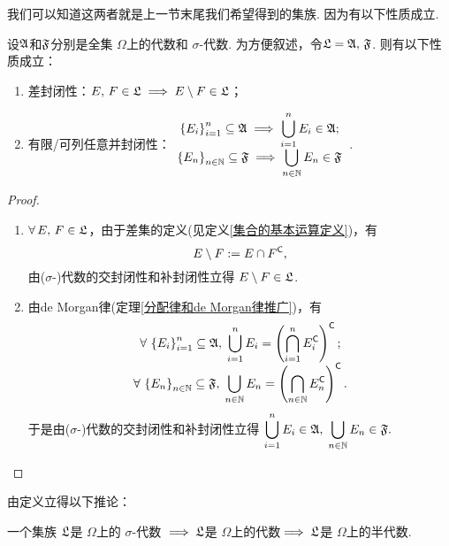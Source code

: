 我们可以知道这两者就是上一节末尾我们希望得到的集族. 因为有以下性质成立.
\begin{proposition}\label{差和并封闭性命题}
    设${\mathfrak{A}}$和${\mathfrak{F}}$分别是全集 $\Omega$上的代数和 $\sigma$-代数. 为方便叙述，令${\mathfrak{L}}={\mathfrak{A}},\,{\mathfrak{F}}$. 则有以下性质成立：
    \begin{enumerate}
        \item 差封闭性：$E,\,F\in{\mathfrak{L}}\implies E\setminus F\in{\mathfrak{L}}$；
        \item 有限/可列任意并封闭性：$\begin{array}{c}
            \displaystyle \left\{ E_i \right\}_{i=1}^n \subseteq{\mathfrak{A}}\implies\bigcup_{i=1}^n E_i\in{\mathfrak{A}} ;   \\
            \displaystyle \left\{ E_n \right\}_{n\in\mathbb{N}} \subseteq{\mathfrak{F}}\implies\bigcup_{n\in\mathbb{N}} E_n\in{\mathfrak{F}}  
        \end{array}$.
    \end{enumerate}
\end{proposition}
\begin{proof}
    \begin{enumerate}
        \item $\forall\,E,\,F\in{\mathfrak{L}}$，由于差集的定义(见定义\ref{集合的基本运算定义})，有
        \[ E\setminus F:= E\cap F^{\mathsf{C}}, \]
        由($\sigma$-)代数的交封闭性和补封闭性立得 $E\setminus F\in{\mathfrak{L}}$.
        \item 由de Morgan律(定理\ref{分配律和de Morgan律推广})，有
        \[\begin{array}{c}
             \displaystyle \forall\,\left\{ E_i \right\}_{i=1}^n\subseteq{\mathfrak{A}},\; \bigcup_{i=1}^n E_i = \left( \bigcap_{i=1}^n E_i^{\mathsf{C}} \right)^{\mathsf{C}}; \\
             \displaystyle \forall\,\left\{ E_n \right\}_{n\in\mathbb{N}}\subseteq{\mathfrak{F}},\; \bigcup_{n\in\mathbb{N}} E_n = \left( \bigcap_{n\in\mathbb{N}} E_n^{\mathsf{C}} \right)^{\mathsf{C}}.
        \end{array}\]
        于是由($\sigma$-)代数的交封闭性和补封闭性立得 $\displaystyle \bigcup_{i=1}^n E_i\in{\mathfrak{A}},\;\bigcup_{n\in\mathbb{N}} E_n\in{\mathfrak{F}}.$
    \end{enumerate}
\end{proof}
\vspace{0.5cm}

由定义立得以下推论：
\begin{corollary}\label{集族从属关系推论}
    一个集族 ${\mathfrak{L}}$是 $\Omega$上的 $\sigma$-代数 $\implies {\mathfrak{L}}$是 $\Omega$上的代数$\implies {\mathfrak{L}}$是 $\Omega$上的半代数.
\end{corollary}
\vspace{0.5cm}

